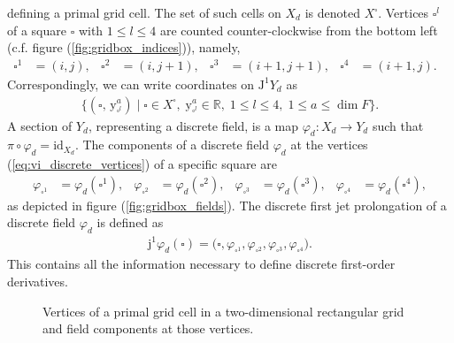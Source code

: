 \documentclass[12pt,a4paper,reqno]{article}
\begin{document}
defining a primal grid cell.
The set of such cells on $X_{d}$ is denoted $X^{\square}$.
Vertices $\square^{l}$ of a square $\square$ with $1 \leq l \leq 4$ are counted counter-clockwise from the bottom left (c.f. figure (\ref{fig:gridbox_indices})), namely,
\begin{align}\label{eq:vi_discrete_vertices}
\square^{1} &= (i,   j  ) , &
\square^{2} &= (i,   j+1) , &
\square^{3} &= (i+1, j+1) , &
\square^{4} &= (i+1, j  ) . &
\end{align}
Correspondingly, we can write coordinates on ${\ensuremath{\mathrm{J}}}^{1} Y_{d}$ as
\begin{align}
\big\{ ( \square, \, {\ensuremath{{\ensuremath{\mathrm{{y}}}}}}_{\square^{l}}^{a} ) \; \big\vert \; \square \in X^{\square} , \; {\ensuremath{{\ensuremath{\mathrm{{y}}}}}}_{\square^{l}}^{a} \in \mathbb{R} , \; 1 \leq l \leq 4 , \; 1 \leq a \leq \dim F \big\} .
\end{align}
A section of $Y_{d}$, representing a discrete field, is a map ${\ensuremath{\varphi}}_{d} : X_{d} \rightarrow Y_{d}$ such that $\pi \circ {\ensuremath{\varphi}}_{d} = {\ensuremath{\mathrm{id}}}_{X_{d}}$.
The components of a discrete field ${\ensuremath{\varphi}}_{d}$ at the vertices (\ref{eq:vi_discrete_vertices}) of a specific square are
\begin{align}\label{eq:vi_discrete_field_vertices}
{\ensuremath{\varphi}}_{\square^{1}} &= {\ensuremath{\varphi}}_{d} (\square^{1}) , &
{\ensuremath{\varphi}}_{\square^{2}} &= {\ensuremath{\varphi}}_{d} (\square^{2}) , &
{\ensuremath{\varphi}}_{\square^{3}} &= {\ensuremath{\varphi}}_{d} (\square^{3}) , &
{\ensuremath{\varphi}}_{\square^{4}} &= {\ensuremath{\varphi}}_{d} (\square^{4}) ,
\end{align}
as depicted in figure (\ref{fig:gridbox_fields}).
The discrete first jet prolongation of a discrete field ${\ensuremath{\varphi}}_{d}$ is defined as
\begin{align}\label{eq:vi_discrete_prolongation_field}
{\ensuremath{\mathrm{j}}}^{1} {\ensuremath{\varphi}}_{d} (\square) = \big( \square, {\ensuremath{\varphi}}_{\square^{1}}, {\ensuremath{\varphi}}_{\square^{2}}, {\ensuremath{\varphi}}_{\square^{3}}, {\ensuremath{\varphi}}_{\square^{4}} \big) .
\end{align}
This contains all the information necessary to define discrete first-order derivatives.

\begin{figure}[tb]
	\centering
	\hspace{1cm}
	\caption{Vertices of a primal grid cell in a two-dimensional rectangular grid and field components at those vertices.}
	\label{fig:gridbox}
\end{figure}
\end{document}
